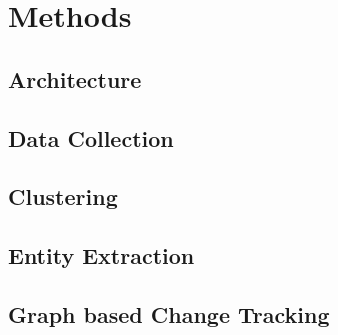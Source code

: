 \section{Methods}

\subsection{Architecture}

\subsection{Data Collection}

\subsection{Clustering}

\subsection{Entity Extraction}

\subsection{Graph based Change Tracking}

